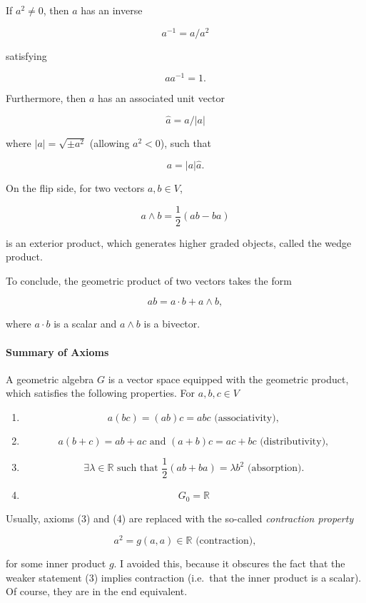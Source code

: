 \documentclass{article}
\begin{document}
If $a^2 \not= 0$, then $a$ has an inverse

$$a^{-1} = a / a^2$$

satisfying

$$a a^{-1} = 1.$$

Furthermore, then $a$ has an associated unit vector

$$\hat a = a / |a|$$

where $|a| = \sqrt{\pm a^2}$ (allowing $a^2 < 0$), such that

$$a = |a| \hat a.$$

On the flip side, for two vectors $a, b \in V$,

$$a \wedge b = \frac{1}{2}(ab - ba)$$

is an exterior product, which generates higher graded objects, called
the wedge product.

To conclude, the geometric product of two vectors takes the form

$$ab = a \cdot b + a \wedge b,$$

where $a \cdot b$ is a scalar and $a \wedge b$ is a bivector.

\paragraph{Summary of Axioms}\label{summary-of-axioms}

A geometric algebra $G$ is a vector space equipped with the geometric
product, which satisfies the following properties. For $a, b, c \in V$

\begin{enumerate}
\item $$a(bc) = (ab)c = abc \text{ (associativity)},$$
\item $$a(b + c) = ab + ac \text{ and } (a + b)c = ac + bc \text{ (distributivity)},$$
\item $$\exists \lambda \in \mathbb{R} \text{ such that } \frac{1}{2}(ab + ba) = \lambda b^2 \text{ (absorption).}$$
\item $$G_0 = \mathbb{R}$$
\end{enumerate}

Usually, axioms (3) and (4) are replaced with the so-called
\emph{contraction property}

$$a^2 = g(a,a) \in \mathbb{R} \text{ (contraction)},$$

for some inner product $g$. I avoided this, because it obscures the
fact that the weaker statement (3) implies contraction (i.e.~that the
inner product is a scalar). Of course, they are in the end equivalent.
\end{document}
